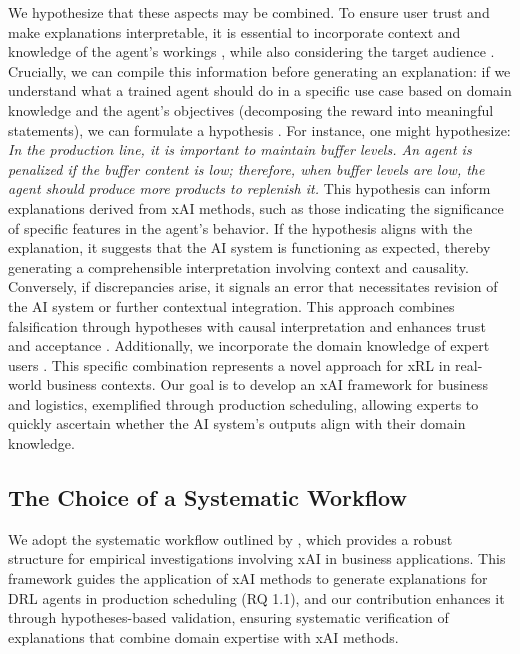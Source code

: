 We hypothesize that these aspects may be combined. To ensure user trust and make explanations interpretable, it is essential to incorporate context and knowledge of the agent's workings , while also considering the target audience . Crucially, we can compile this information before generating an explanation: if we understand what a trained agent should do in a specific use case based on domain knowledge and the agent's objectives (decomposing the reward into meaningful statements), we can formulate a hypothesis . For instance, one might hypothesize: \textit{In the production line, it is important to maintain buffer levels. An agent is penalized if the buffer content is low; therefore, when buffer levels are low, the agent should produce more products to replenish it.} This hypothesis can inform explanations derived from xAI methods, such as those indicating the significance of specific features in the agent's behavior. If the hypothesis aligns with the explanation, it suggests that the AI system is functioning as expected, thereby generating a comprehensible interpretation involving context and causality. Conversely, if discrepancies arise, it signals an error that necessitates revision of the AI system or further contextual integration. This approach combines falsification through hypotheses  with causal interpretation  and enhances trust and acceptance . Additionally, we incorporate the domain knowledge of expert users . This specific combination represents a novel approach for xRL in real-world business contexts. Our goal is to develop an xAI framework for business and logistics, exemplified through production scheduling, allowing experts to quickly ascertain whether the AI system's outputs align with their domain knowledge.

\subsection{The Choice of a Systematic Workflow}
\label{systematic workflow}
We adopt the systematic workflow outlined by , which provides a robust structure for empirical investigations involving xAI in business applications. This framework guides the application of xAI methods to generate explanations for DRL agents in production scheduling (RQ 1.1), and our contribution enhances it through hypotheses-based validation, ensuring systematic verification of explanations that combine domain expertise with xAI methods.

